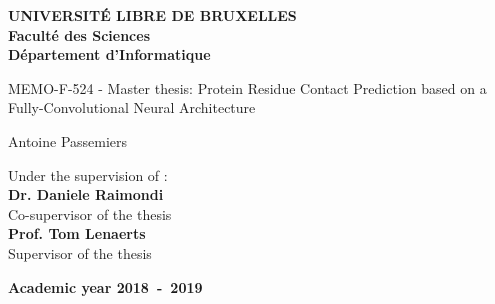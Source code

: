 \documentclass[11pt,a4paper,oneside]{thesis}
\begin{document}
\frontmatter
\begin{titlepage}
\begin{center}
\textbf{UNIVERSIT\'E LIBRE DE BRUXELLES}\\
\textbf{Facult\'{e} des Sciences}\\
\textbf{D\'{e}partement d'Informatique}
\vfill{}\vfill{}

{\LARGE  MEMO-F-524 - Master thesis:
 \vspace*{2cm}
 \linebreak[4] Protein Residue Contact Prediction based on a \\
 \vspace*{0.4cm} Fully-Convolutional Neural Architecture}

\vspace{0.5cm}

{\Huge \par}
\begin{center}{\Large Antoine Passemiers}\end{center}{\Huge \par}
\vfill{}\vfill{}
\large Under the supervision of : \\
\vspace*{1cm}
\vspace{0.2cm}
\textbf{Dr. Daniele Raimondi} \\
\large Co-supervisor of the thesis \\
\vspace{0.5cm}
\textbf{Prof. Tom Lenaerts} \\
\large Supervisor of the thesis \\
{\large }\hfill{}{}
{\large\par}\vfill{}\vfill{}\enlargethispage{3cm}
\textbf{Academic year 2018~-~2019}
\end{center}
\end{titlepage}


\thispagestyle{empty} 
\null

\makeatletter
\def\BState{\State\hskip-\ALG@thistlm}
\makeatother

\newenvironment{vcenterpage}
{\newpage\thispagestyle{empty} 
\vspace*{\fill}}
{\vspace*{\fill}\par\pagebreak}
\end{document}
